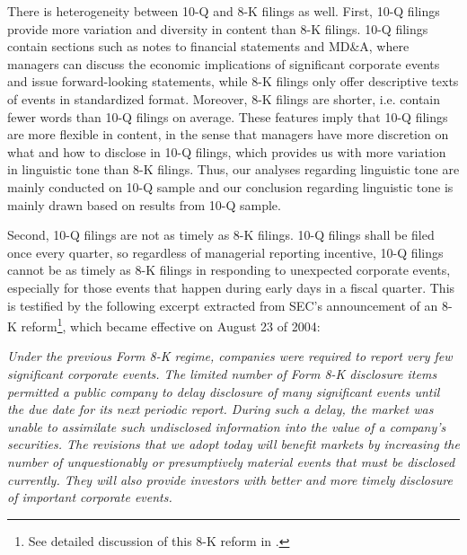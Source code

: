 \documentclass[a4paper]{article}
\begin{document}
\begin{spacing}{2}
There is heterogeneity between 10-Q and 8-K filings as well. First, 10-Q filings provide more variation and diversity in content than 8-K filings. 10-Q filings contain sections such as notes to financial statements and MD\&A, where managers can discuss the economic implications of significant corporate events and issue forward-looking statements, while 8-K filings only offer descriptive texts of events in standardized format. Moreover, 8-K filings are shorter, i.e. contain fewer words than 10-Q filings on average. These features imply that 10-Q filings are more flexible in content, in the sense that managers have more discretion on what and how to disclose in 10-Q filings, which provides us with more variation in linguistic tone than 8-K filings. Thus, our analyses regarding linguistic tone are mainly conducted on 10-Q sample and our conclusion regarding linguistic tone is mainly drawn based on results from 10-Q sample. 

Second, 10-Q filings are not as timely as 8-K filings. 10-Q filings shall be filed once every quarter, so regardless of managerial reporting incentive, 10-Q filings cannot be as timely as 8-K filings in responding to unexpected corporate events, especially for those events that happen during early days in a fiscal quarter. This is testified by the following excerpt extracted from SEC's announcement of an 8-K reform\footnote{See detailed discussion of this 8-K reform in \citet{lermanNewForm8K2010}.}, which became effective on August 23 of 2004: 

\textit{Under the previous Form 8-K regime, companies were required to report very few significant corporate events. The limited number of Form 8-K disclosure items permitted a public company to delay disclosure of many significant events until the due date for its next periodic report. During such a delay, the market was unable to assimilate such undisclosed information into the value of a company's securities. The revisions that we adopt today will benefit markets by increasing the number of unquestionably or presumptively material events that must be disclosed currently. They will also provide investors with better and more timely disclosure of important corporate events.}

\begin{flushright}
	\citep[Final Rule: Additional Form 8-K Disclosure Requirements and Acceleration of Filing Date,][]{secFinalRuleAdditional2004}
\end{flushright}


\end{spacing}
\end{document}
